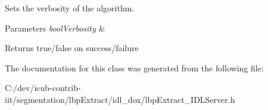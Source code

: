 Sets the verbosity of the algorithm. 


\begin{DoxyParams}{Parameters}
{\em bool\+Verbosity} & \\
\hline
\end{DoxyParams}
\begin{DoxyReturn}{Returns}
true/false on success/failure 
\end{DoxyReturn}


The documentation for this class was generated from the following file\+:\begin{DoxyCompactItemize}
\item 
C\+:/dev/icub-\/contrib-\/iit/segmentation/lbp\+Extract/idl\+\_\+dox/lbp\+Extract\+\_\+\+I\+D\+L\+Server.\+h\end{DoxyCompactItemize}
